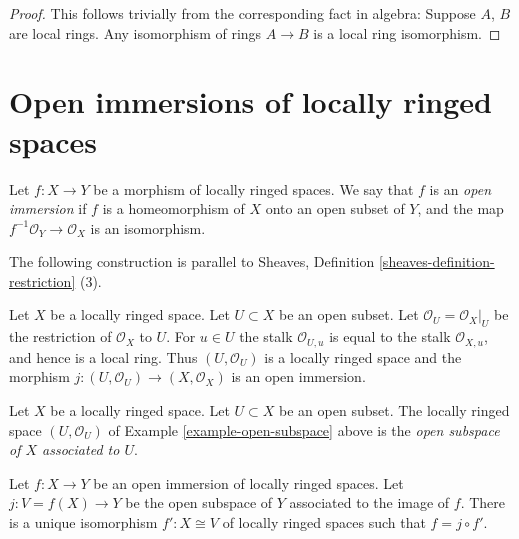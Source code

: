 \begin{proof}
This follows trivially from the corresponding fact in algebra:
Suppose $A$, $B$ are local rings. Any isomorphism of rings
$A \to B$ is a local ring isomorphism.
\end{proof}













\section{Open immersions of locally ringed spaces}
\label{section-open-immersion}

\begin{definition}
\label{definition-immersion-locally-ringed-spaces}
Let $f : X \to Y$ be a morphism of locally ringed spaces.
We say that $f$ is an {\it open immersion} if
$f$ is a homeomorphism of $X$ onto an open subset
of $Y$, and the map $f^{-1}\mathcal{O}_Y \to \mathcal{O}_X$
is an isomorphism.
\end{definition}

\noindent
The following construction is parallel to
Sheaves, Definition \ref{sheaves-definition-restriction} (3).

\begin{example}
\label{example-open-subspace}
Let $X$ be a locally ringed space.
Let $U \subset X$ be an open subset.
Let $\mathcal{O}_U = \mathcal{O}_X|_U$
be the restriction of $\mathcal{O}_X$ to $U$.
For $u \in U$ the stalk $\mathcal{O}_{U, u}$
is equal to the stalk $\mathcal{O}_{X, u}$, and hence is a
local ring. Thus $(U, \mathcal{O}_U)$ is a locally ringed
space and the morphism $j : (U, \mathcal{O}_U) \to (X, \mathcal{O}_X)$
is an open immersion.
\end{example}

\begin{definition}
\label{definition-open-subspace}
Let $X$ be a locally ringed space.
Let $U \subset X$ be an open subset.
The locally ringed space $(U, \mathcal{O}_U)$
of Example \ref{example-open-subspace} above
is the {\it open subspace of $X$ associated to $U$}.
\end{definition}

\begin{lemma}
\label{lemma-open-immersion}
Let $f : X \to Y$ be an open immersion of
locally ringed spaces. Let $j : V = f(X) \to Y$
be the open subspace of $Y$ associated to the image of $f$.
There is a unique isomorphism $f' : X \cong V$ of
locally ringed spaces such that $f = j \circ f'$.
\end{lemma}


